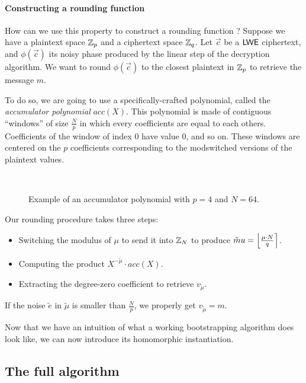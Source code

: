 \paragraph{Constructing a rounding function}
How can we use this property to construct a rounding function ? Suppose we have a plaintext space $\mathbb{Z}_p$ and a ciphertext space $\mathbb{Z}_q$. Let $\vec c$ be  a $\textsf{LWE}$ ciphertext, and $\phi(\vec c)$ its noisy phase produced by the linear step of the decryption algorithm. We want to round $\phi(\vec c)$ to the closest plaintext in $\mathbb{Z}_p$ to retrieve the message $m$.

To do so, we are going to use a specifically-crafted polynomial, called the \textit{accumulator polynomial} $acc(X)$. This polynomial is made of contiguous ``windows'' of size $\frac N p$ in which every coefficients are equal to each others. Coefficients of the window of index 0 have value 0, and so on. These windows are centered on the $p$ coefficients corresponding to the modswitched versions of the plaintext values.





\begin{figure}[htbp]
	\centering
	 \\[1em] %
	\label{fig:illustration_accumulator}
	\caption{Example of an accumulator polynomial with $p=4$ and $N=64$.}
\end{figure}



Our rounding procedure takes three steps:
\begin{itemize}
	\item Switching the modulus of $\mu$ to send it into $\mathbb{Z}_N$ to produce $\tilde mu = \left \lfloor \frac{\mu \cdot N}{q} \right \rceil$.
	\item Computing the product $X^{- \tilde \mu} \cdot acc(X)$.
	\item Extracting the degree-zero coefficient to retrieve $v_{\tilde \mu}$.
\end{itemize}

If the noise $\tilde e$ in $\tilde \mu$ is smaller than $\frac{N}{p}$, we properly get $v_{\tilde \mu} = m$.



Now that we have an intuition of what a working bootstrapping algorithm does look like, we can now introduce its homomorphic instantiation. 


\subsection{The full algorithm}


